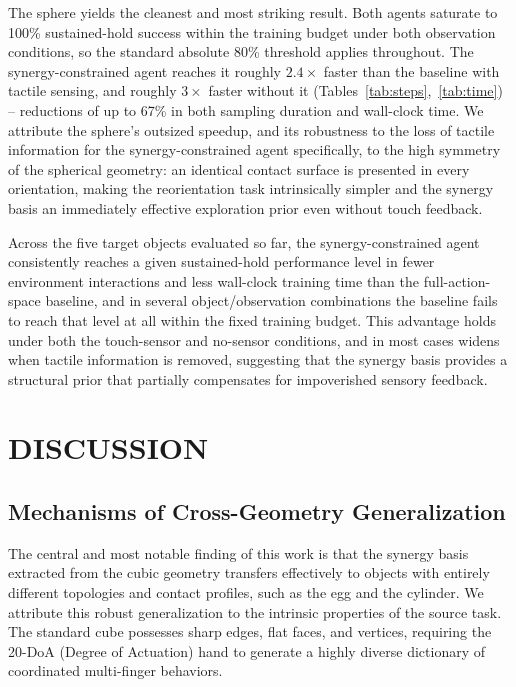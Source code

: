 \documentclass[letterpaper, 10 pt, conference]{ieeeconf}  %
\begin{document}
The sphere yields the cleanest and most striking result. Both agents saturate to 100\% sustained-hold success within the training budget under both observation conditions, so the standard absolute 80\% threshold applies throughout. The synergy-constrained agent reaches it roughly $2.4\times$ faster than the baseline with tactile sensing, and roughly $3\times$ faster without it (Tables~\ref{tab:steps},~\ref{tab:time}) -- reductions of up to 67\% in both sampling duration and wall-clock time. We attribute the sphere's outsized speedup, and its robustness to the loss of tactile information for the synergy-constrained agent specifically, to the high symmetry of the spherical geometry: an identical contact surface is presented in every orientation, making the reorientation task intrinsically simpler and the synergy basis an immediately effective exploration prior even without touch feedback.

Across the five target objects evaluated so far, the synergy-constrained agent consistently reaches a given sustained-hold performance level in fewer environment interactions and less wall-clock training time than the full-action-space baseline, and in several object/observation combinations the baseline fails to reach that level at all within the fixed training budget. This advantage holds under both the touch-sensor and no-sensor conditions, and in most cases widens when tactile information is removed, suggesting that the synergy basis provides a structural prior that partially compensates for impoverished sensory feedback.



\section{DISCUSSION}
\subsection{Mechanisms of Cross-Geometry Generalization}
The central and most notable finding of this work is that the synergy basis extracted from the cubic geometry transfers effectively to objects with entirely different topologies and contact profiles, such as the egg and the cylinder. We attribute this robust generalization to the intrinsic properties of the source task. The standard cube possesses sharp edges, flat faces, and vertices, requiring the 20-DoA (Degree of Actuation) hand to generate a highly diverse dictionary of coordinated multi-finger behaviors. 
\end{document}
